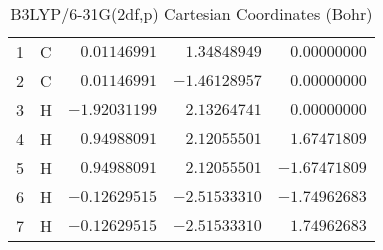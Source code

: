 \documentclass[10pt,oneside]{article}
\begin{document}
\begin{table}[h]
\centering
\caption{B3LYP/6-31G(2df,p) Cartesian Coordinates (Bohr)}
\begin{tabular}{llrrr}
\toprule
1  & C  & $ 0.01146991$ & $ 1.34848949$ & $ 0.00000000$ \\
2  & C  & $ 0.01146991$ & $-1.46128957$ & $ 0.00000000$ \\
3  & H  & $-1.92031199$ & $ 2.13264741$ & $ 0.00000000$ \\
4  & H  & $ 0.94988091$ & $ 2.12055501$ & $ 1.67471809$ \\
5  & H  & $ 0.94988091$ & $ 2.12055501$ & $-1.67471809$ \\
6  & H  & $-0.12629515$ & $-2.51533310$ & $-1.74962683$ \\
7  & H  & $-0.12629515$ & $-2.51533310$ & $ 1.74962683$ \\
\bottomrule
\end{tabular}
\end{table}
\end{document}
